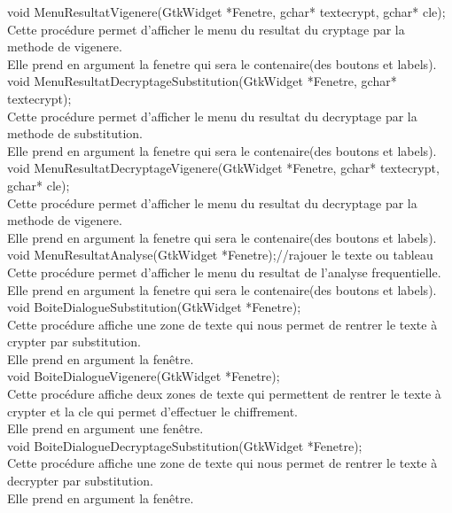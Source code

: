 \documentclass[a4]{article}
\begin{document}
	void MenuResultatVigenere(GtkWidget *Fenetre, gchar* textecrypt, gchar* cle);\\
		Cette procédure permet d'afficher le menu du resultat du cryptage par la methode de vigenere.\\
		Elle prend en argument la fenetre qui sera le contenaire(des boutons et labels).\\
		
	void MenuResultatDecryptageSubstitution(GtkWidget *Fenetre, gchar* textecrypt);\\
		Cette procédure permet d'afficher le menu du resultat du decryptage par la methode de substitution.\\
		Elle prend en argument la fenetre qui sera le contenaire(des boutons et labels).\\
	
	void MenuResultatDecryptageVigenere(GtkWidget *Fenetre, gchar* textecrypt, gchar* cle);\\
		Cette procédure permet d'afficher le menu du resultat du decryptage par la methode de vigenere.\\
		Elle prend en argument la fenetre qui sera le contenaire(des boutons et labels).\\
	
	void MenuResultatAnalyse(GtkWidget *Fenetre);//rajouer le texte ou tableau\\
		Cette procédure permet d'afficher le menu du resultat de l'analyse frequentielle.\\
		Elle prend en argument la fenetre qui sera le contenaire(des boutons et labels).\\
	
	void BoiteDialogueSubstitution(GtkWidget *Fenetre);\\
		Cette procédure affiche une zone de texte qui nous permet de rentrer le texte à crypter par substitution.\\
		Elle prend en argument la fenêtre.\\
	
	void BoiteDialogueVigenere(GtkWidget *Fenetre);\\
		Cette procédure affiche deux zones de texte qui permettent de rentrer le texte à crypter et la cle qui permet d'effectuer le chiffrement.\\
		Elle prend en argument une fenêtre.\\
		
	void BoiteDialogueDecryptageSubstitution(GtkWidget *Fenetre);\\
		Cette procédure affiche une zone de texte qui nous permet de rentrer le texte à decrypter par substitution.\\
		Elle prend en argument la fenêtre.\\
	
\end{document}
